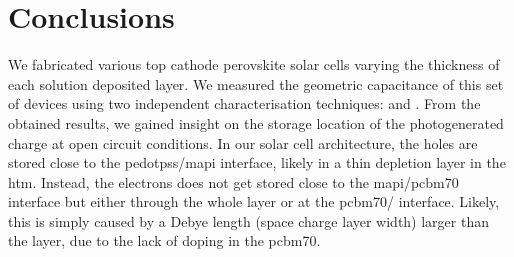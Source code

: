 \section{Conclusions}
	We fabricated various top cathode perovskite solar cells varying the thickness of each solution deposited layer.
	We measured the geometric capacitance of this set of devices using two independent characterisation techniques:  and .
	From the obtained results, we gained insight on the storage location of the photogenerated charge at open circuit conditions.
	In our solar cell architecture, the holes are stored close to the \gls{pedotpss}\-/\gls{mapi} interface, likely in a thin depletion layer in the \gls{htm}.
	Instead, the electrons does not get stored close to the \gls{mapi}\-/\gls{pcbm70} interface but either through the whole  layer or at the \gls{pcbm70}\-/ interface.
	Likely, this is simply caused by a Debye length (space charge layer width) larger than the  layer, due to the lack of doping in the \gls{pcbm70}.



